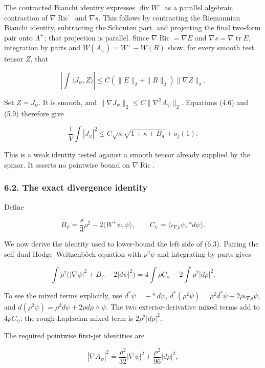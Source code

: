 \documentclass[
  10pt,
]{article}
\begin{document}
The contracted Bianchi identity expresses \(\operatorname{div}W^+\) as a
parallel algebraic contraction of \(\nabla\operatorname{Ric}^\circ\) and
\(\nabla s\). This follows by contracting the Riemannian Bianchi
identity, subtracting the Schouten part, and projecting the final
two-form pair onto \(\Lambda^+\); that projection is parallel. Since
\(\nabla\operatorname{Ric}=\nabla E\) and
\(\nabla s=\nabla\operatorname{tr}E\), integration by parts and
\(W(A_\psi)=W^+-W(R)\) show, for every smooth test tensor \(Z\), that

\[
 \left|\int\langle J_\psi,Z\rangle\right|
       \le C(\|E\|_2+\|R\|_2)\|\nabla Z\|_2.
 \tag{6.2}
\]

Set \(Z=J_\psi\). It is smooth, and
\(\|\nabla J_\psi\|_2\le C\|\nabla^2A_\psi\|_2\). Equations (4.6) and
(5.9) therefore give

\[
 \frac1V\int|J_\psi|^2
            \le C\sqrt\kappa\sqrt{1+\kappa+B_a}+o_j(1).
 \tag{6.3}
\]

This is a weak identity tested against a smooth tensor already supplied
by the spinor. It asserts no pointwise bound on
\(\nabla\operatorname{Ric}\).

\hypertarget{the-exact-divergence-identity}{%
\subsubsection{6.2. The exact divergence
identity}\label{the-exact-divergence-identity}}

Define

\[
 B_\psi=\frac{s}{3}\rho^2-2\langle W^+\psi,\psi\rangle,
 \qquad C_\psi=\langle\iota_{\nabla\rho}\psi,*d\psi\rangle.
\]

We now derive the identity used to lower-bound the left side of (6.3).
Pairing the self-dual Hodge--Weitzenböck equation with \(\rho^2\psi\)
and integrating by parts gives

\[
 \int\rho^2\bigl(|\nabla\psi|^2+B_\psi-2|d\psi|^2\bigr)
          =4\int\rho C_\psi-2\int\rho^2|d\rho|^2.
 \tag{6.4}
\]

To see the mixed terms explicitly, use \(d^*\psi=-*d\psi\),
\(d^*(\rho^2\psi)=\rho^2d^*\psi-2\rho\iota_{\nabla\rho}\psi\), and
\(d(\rho^2\psi)=\rho^2d\psi+2\rho d\rho\wedge\psi\). The two
exterior-derivative mixed terms add to \(4\rho C_\psi\); the
rough-Laplacian mixed term is \(2\rho^2|d\rho|^2\).

The required pointwise first-jet identities are

\[
 |\nabla A_\psi|^2
       =\frac{\rho^2}{32}|\nabla\psi|^2
                                +\frac{\rho^2}{96}|d\rho|^2,
 \tag{6.5}
\]
\end{document}
